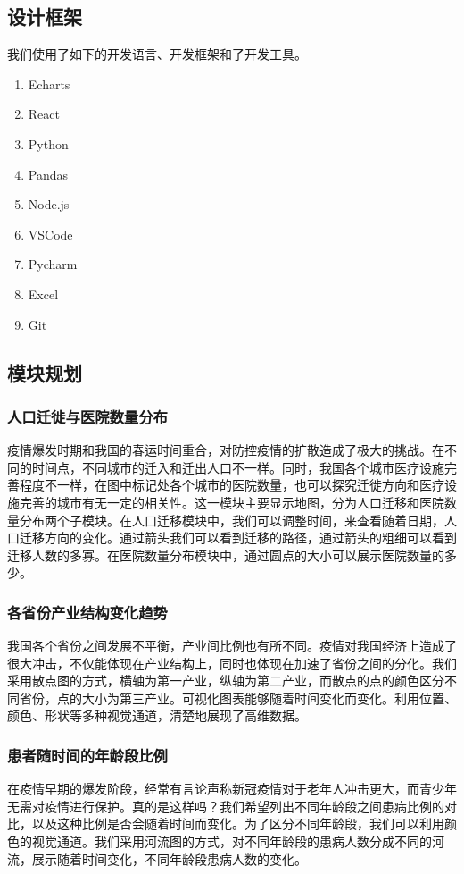 \documentclass{ctexart}
\begin{document}
\subsection{设计框架}
我们使用了如下的开发语言、开发框架和了开发工具。
\begin{enumerate}
    \item Echarts
    \item React
    \item Python
    \item Pandas
    \item Node.js
    \item VSCode
    \item Pycharm
    \item Excel
    \item Git
\end{enumerate}
\subsection{模块规划}
\subsubsection{人口迁徙与医院数量分布}
疫情爆发时期和我国的春运时间重合，对防控疫情的扩散造成了极大的挑战。在不同的时间点，不同城市的迁入和迁出人口不一样。同时，我国各个城市医疗设施完善程度不一样，在图中标记处各个城市的医院数量，也可以探究迁徙方向和医疗设施完善的城市有无一定的相关性。这一模块主要显示地图，分为人口迁移和医院数量分布两个子模块。在人口迁移模块中，我们可以调整时间，来查看随着日期，人口迁移方向的变化。通过箭头我们可以看到迁移的路径，通过箭头的粗细可以看到迁移人数的多寡。在医院数量分布模块中，通过圆点的大小可以展示医院数量的多少。
\subsubsection{各省份产业结构变化趋势}
我国各个省份之间发展不平衡，产业间比例也有所不同。疫情对我国经济上造成了很大冲击，不仅能体现在产业结构上，同时也体现在加速了省份之间的分化。我们采用散点图的方式，横轴为第一产业，纵轴为第二产业，而散点的点的颜色区分不同省份，点的大小为第三产业。可视化图表能够随着时间变化而变化。利用位置、颜色、形状等多种视觉通道，清楚地展现了高维数据。
\subsubsection{患者随时间的年龄段比例}
在疫情早期的爆发阶段，经常有言论声称新冠疫情对于老年人冲击更大，而青少年无需对疫情进行保护。真的是这样吗？我们希望列出不同年龄段之间患病比例的对比，以及这种比例是否会随着时间而变化。为了区分不同年龄段，我们可以利用颜色的视觉通道。我们采用河流图的方式，对不同年龄段的患病人数分成不同的河流，展示随着时间变化，不同年龄段患病人数的变化。
\end{document}
